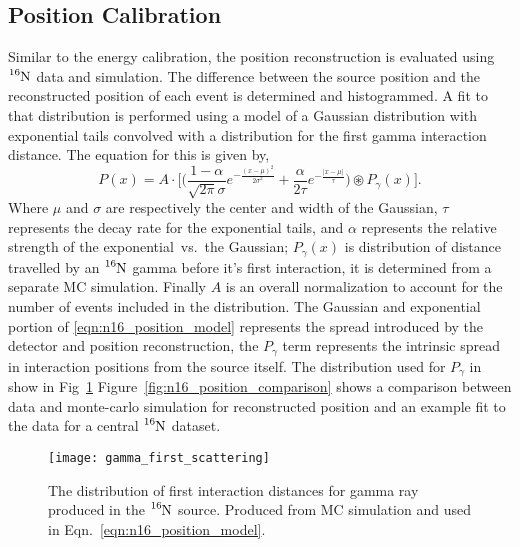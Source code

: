\subsection{Position Calibration}
Similar to the energy calibration, the position reconstruction is evaluated
using $\ce{^{16}N}$ data and simulation.
The difference between the source position and the reconstructed
position of each event is determined and histogrammed.
A fit to that distribution is performed using a model of a Gaussian distribution
with exponential tails convolved with a distribution for the first gamma interaction
distance. The equation for this is given by,
\begin{equation}
    P(x)  = A \cdot \bigg[ \bigg(\frac{1 - \alpha}{\sqrt{2\pi}\sigma}e^{- \frac{(x-\mu)^2}{2\sigma^2}} + \frac{\alpha }{2 \tau}e^{-\frac{|x-\mu|}{\tau}}\bigg) \circledast P_{\gamma}(x) \bigg]\text{.}
    \label{eqn:n16_position_model}
\end{equation}
Where $\mu$ and $\sigma$ are respectively the center and width of the Gaussian,
$\tau$ represents the decay rate for the exponential tails, and $\alpha$ represents
the relative strength of the exponential~vs.~the Gaussian;
$P_{\gamma}(x)$ is distribution of distance travelled by an $\ce{^{16}N}$
gamma before it's first interaction, it is determined from a separate MC
simulation.
Finally $A$ is an overall normalization to account for the number of events
included in the distribution.
The Gaussian and exponential portion of
\eqref{eqn:n16_position_model} represents the spread introduced by the detector
and position reconstruction, the $P_\gamma$ term represents the intrinsic spread
in interaction positions from the source itself.
The distribution used for $P_\gamma$ in show in Fig~\ref{fig:gamma_first}
Figure~\ref{fig:n16_position_comparison} shows a comparison between data
and monte-carlo simulation for reconstructed position and an example fit to the data
for a central $\ce{^{16}N}$ dataset.
\begin{figure}[htbp]
    \centering
    \texttt{[image: gamma\_first\_scattering]}
    \caption[Distribution of Gamma First Interaction Distance]{
    The distribution of first interaction distances for gamma ray produced
    in the $\ce{^{16}N}$ source. Produced from MC simulation and used in
    Eqn.~\eqref{eqn:n16_position_model}.}
    \label{fig:gamma_first}
\end{figure}

